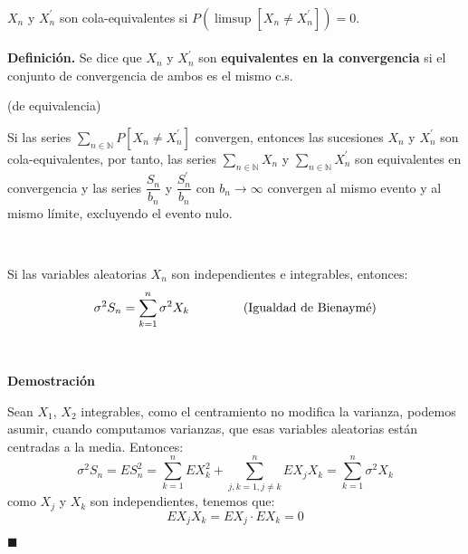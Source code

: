 \documentclass[12pt,a4paper]{book}
\newcommand*{\qed}{\hfill\ensuremath{\blacksquare}}
\begin{document}
\

$X_n$ y $X_n^{'}$ son cola-equivalentes si 
$P \left( \limsup [X_n \not = X_n^{'}] \right) = 0$.
\\\\
\textbf{Definición. } %
Se dice que $X_n$ y $X_n^{\prime}$ son  \textbf{equivalentes en la convergencia} si el conjunto de convergencia de ambos es el mismo c.s.



\begin{lemma} (de equivalencia)
	
Si las series $\sum_{n\in\mathbb{N}} P[X_n\neq X_n^{\prime}]$ convergen, entonces las sucesiones $X_n$ y $X_n^{\prime}$ son cola-equivalentes, por tanto, las series $\sum_{n\in\mathbb{N}} X_n$ y $\sum_{n\in\mathbb{N}} X_n^{\prime}$ son equivalentes en  convergencia y las series $\dfrac{S_n}{b_n}$ y $\dfrac{S_n^{\prime}}{b_n}$ con $b_n \rightarrow\infty$ convergen al mismo evento y al mismo límite, excluyendo el evento nulo.
\end{lemma}



\

Si las variables aleatorias $X_n$ son independientes e integrables, entonces:
$$ \sigma^2 S_n=\sum_{k=1}^n \sigma^2 X_k \hspace{1.5cm} \text{(Igualdad de Bienaymé)}$$

\

\textbf{Demostración}

Sean $X_1$, $X_2$ integrables, como el centramiento no modifica la varianza, podemos asumir, cuando computamos varianzas, que esas variables aleatorias están centradas a la media. Entonces:
$$\sigma^2 S_n=ES_n^2=\sum_{k=1}^n EX_k^2+\sum_{j,k=1, j\not = k}^n EX_jX_k=\sum_{k=1}^n\sigma^2 X_k$$
como $X_j$ y $X_k$ son independientes, tenemos que:
$$EX_jX_k=EX_j\cdot EX_k=0$$

\qed


\
\end{document}

